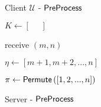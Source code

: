 \noindent
\begin{figure}[H]
    \begin{minipage}{0.5\textwidth}
        \begin{algorithm}[H]
            \LinesNumbered
            \caption{Client $ \mathcal{U} $ - \newline $ \mathsf{{PreProcess}} $}
            \label{algo:ClientPreProcess}
            \KwIn{\phantom{$ D' $}}
            
            \vspace*{0.48cm}
    
    
            \vspace*{0.48cm}
    
            $ K \gets \left[ \phantom{=} \right] $ 
    
            receive $ \left(m, n\right) $
    
            $ \eta \gets \left[ m + 1, m + 2, ... , n \right] $
        
            $ \pi \gets \mathsf{{Permute}} \left( \left[ 1, 2, ... , n \right] \right) $
    
    
            \vspace*{0.48cm}
        
    
        \end{algorithm}
    \end{minipage}
    \begin{minipage}{0.49\textwidth}
        \begin{algorithm}[H]
            \LinesNumbered
            \caption{Server - \newline $ \mathsf{{PreProcess}} $}
            \label{algo:ServerPreProcess}
    

\end{algorithm}
\end{minipage}
\end{figure}
